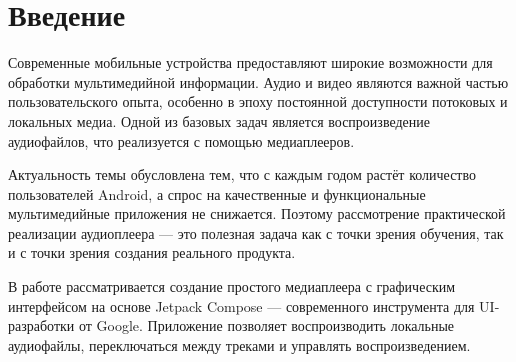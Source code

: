 \chapter{Введение}
 Современные мобильные устройства предоставляют широкие возможности для обработки мультимедийной информации.
  Аудио и видео являются важной частью пользовательского опыта, особенно в эпоху постоянной доступности потоковых и локальных медиа.
   Одной из базовых задач является воспроизведение аудиофайлов, что реализуется с помощью медиаплееров.

Актуальность темы обусловлена тем, что с каждым годом растёт количество пользователей Android, а спрос на качественные и функциональные мультимедийные приложения не снижается.
 Поэтому рассмотрение практической реализации аудиоплеера — это полезная задача как с точки зрения обучения, так и с точки зрения создания реального продукта.

В работе рассматривается создание простого медиаплеера с графическим интерфейсом на основе Jetpack Compose — современного инструмента для UI-разработки от Google. 
Приложение позволяет воспроизводить локальные аудиофайлы, переключаться между треками и управлять воспроизведением.
